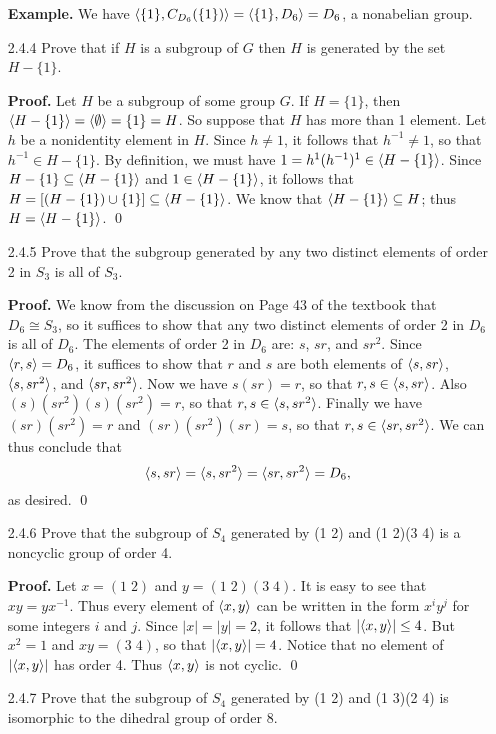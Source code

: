\begin{enumerate}
      \textbf{Example.} We have $\langle \{1\}, C_{D_6}(\{1\}) \rangle =
      \langle \{1\}, D_6 \rangle= D_6$, a nonabelian group.
   \item[2.4.4]   Prove that if $H$ is a subgroup of $G$ then $H$ is generated
                  by the set $H - \{1\}$.

      \textbf{Proof.} Let $H$ be a subgroup of some group $G$. If $H = \{1\}$,
      then $\langle H - \{1\} \rangle = \langle \emptyset \rangle = \{1\} = H$. So suppose that
      $H$ has more than 1 element. Let $h$ be a nonidentity element in $H$.
      Since $h \neq 1$, it follows that $h^{-1} \neq 1$, so that
      $h^{-1} \in H - \{1\}$. By definition, we must
      have $1 = h^1(h^{-1})^1 \in  \langle H - \{1\} \rangle$. Since
      $H - \{1\} \subseteq \langle H - \{1\} \rangle$ and $1 \in \langle H - \{1\} \rangle$, it 
      follows that $H = [(H - \{1\}) \cup \{1\}] \subseteq \langle H - \{1\} \rangle$. We
      know that $\langle H - \{1\} \rangle \subseteq H$; thus $H = \langle H - \{1\} \rangle$. \qed
   \item[2.4.5]   Prove that the subgroup generated by any two distinct elements
                  of order 2 in $S_3$ is all of $S_3$.

      \textbf{Proof.} We know from the discussion on Page 43 of the textbook
      that $D_6 \cong S_3$, so it suffices to show that any two distinct
      elements of order 2 in $D_6$ is all of $D_6$. The elements of order 2 in
      $D_6$ are: $s$, $sr$, and $sr^2$. Since $\langle r, s \rangle = D_6$, it suffices to
      show that $r$ and $s$ are both elements of $\langle s, sr \rangle$, $\langle s, sr^2 \rangle$,
      and $\langle sr, sr^2 \rangle$. Now we have $s(sr) = r$, so that
      $r, s \in \langle s, sr \rangle$. Also $(s)(sr^2)(s)(sr^2) = r$, so that
      $r, s \in \langle s, sr^2 \rangle$. Finally we have $(sr)(sr^2) = r$ and
      $(sr)(sr^2)(sr) = s$, so that $r, s \in \langle sr, sr^2 \rangle$. We can thus
      conclude that
      $$\langle s, sr \rangle = \langle s, sr^2 \rangle = \langle sr, sr^2 \rangle = D_6,$$
      as desired. \qed
   \item[2.4.6]   Prove that the subgroup of $S_4$ generated by (1 2) and
                  (1 2)(3 4) is a noncyclic group of order 4.

      \textbf{Proof.} Let $x = (1\;2)$ and $y = (1\;2)(3\;4)$. It is easy to see
      that $xy = yx^{-1}$. Thus every element of $\langle x, y \rangle$ can be written in
      the form $x^iy^j$ for some integers $i$ and $j$. Since $|x| = |y| = 2$, it
      follows that $|\langle x, y \rangle| \le 4$. But $x^2 = 1$ and $xy = (3\;4)$, so
      that $|\langle x, y \rangle| = 4$. Notice that no element of $|\langle x, y \rangle|$ has
      order 4. Thus $\langle x, y \rangle$ is not cyclic. \qed
   \item[2.4.7]   Prove that the subgroup of $S_4$ generated by (1 2) and
                  (1 3)(2 4) is isomorphic to the dihedral group of order 8.


\end{enumerate}

